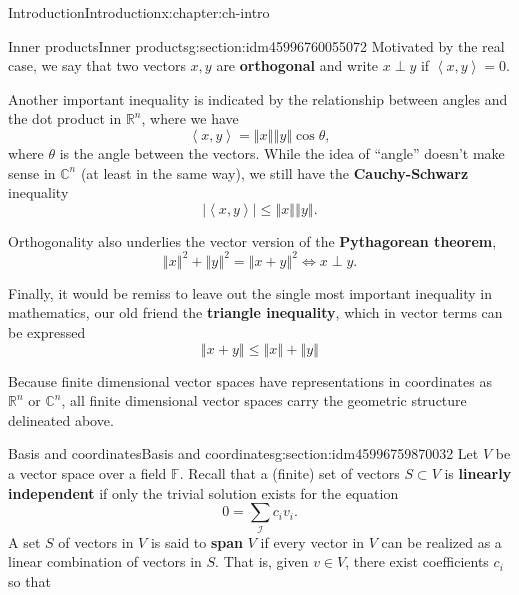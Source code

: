 \documentclass[oneside,10pt,]{book}
\newcommand{\terminology}[1]{\textbf{#1}}
\numberwithin{equation}{section}
\newcommand{\F}{\mathbb{F}}
\newcommand{\C}{\mathbb{C}}
\newcommand{\R}{\mathbb{R}}
\newcommand{\abs}[1]{\left\vert#1\right\vert}
\newcommand{\norm}[1]{\left\Vert#1\right\Vert}
\newcommand{\ip}[2]{\left\langle #1, #2 \right\rangle}
\numberwithin{equation}{section}
\begin{document}
\begin{chapterptx}{Introduction}{}{Introduction}{}{}{x:chapter:ch-intro}
\begin{sectionptx}{Inner products}{}{Inner products}{}{}{g:section:idm45996760055072}
Motivated by the real case, we say that two vectors \(x, y\) are \terminology{orthogonal} and write \(x \perp y\) if \(\ip{x}{y} = 0\).%
\par
Another important inequality is indicated by the relationship between angles and the dot product in \(\R^n\), where we have%
\begin{equation*}
\ip{x}{y} = \norm{x}\norm{y}\cos \theta,
\end{equation*}
where \(\theta\) is the angle between the vectors. While the idea of ``angle'' doesn't make sense in \(\C^n\) (at least in the same way), we still have the \terminology{Cauchy-Schwarz} inequality%
\begin{equation}
\abs{\ip{x}{y}} \leq \norm{x}\norm{y}.\label{g:men:idm45996759830512}
\end{equation}
%
\par
Orthogonality also underlies the vector version of the \terminology{Pythagorean theorem},%
\begin{equation}
\norm{x}^2 + \norm{y}^2 = \norm{x+ y}^2 \iff x\perp y.\label{g:men:idm45996759842752}
\end{equation}
%
\par
Finally, it would be remiss to leave out the single most important inequality in mathematics, our old friend the \terminology{triangle inequality}, which in vector terms can be expressed%
\begin{equation}
\norm{x + y} \leq \norm{x} + \norm{y}\label{g:men:idm45996759854272}
\end{equation}
%
\par
Because finite dimensional vector spaces have representations in coordinates as \(\R^n\) or \(\C^n\), all finite dimensional vector spaces carry the geometric structure delineated above.%
\end{sectionptx}
%
%
\typeout{************************************************}
\typeout{************************************************}
%
\begin{sectionptx}{Basis and coordinates}{}{Basis and coordinates}{}{}{g:section:idm45996759870032}
Let \(V\) be a vector space over a field \(\F\). Recall that a (finite) set of vectors \(S \subset V\) is \terminology{linearly independent} if only the trivial solution exists for the equation%
\begin{equation}
0 = \sum_\mathcal{I} c_i v_i.\label{g:men:idm45996759898992}
\end{equation}
A set \(S\) of vectors in \(V\) is said to \terminology{span} \(V\) if every vector in \(V\) can be realized as a linear combination of vectors in \(S\). That is, given \(v \in V\), there exist coefficients \(c_i\) so that%

\end{sectionptx}
\end{chapterptx}
\end{document}
